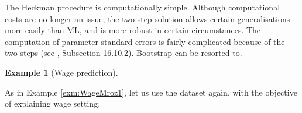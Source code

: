 \documentclass[
  12pt,
]{book}
\newenvironment{Shaded}{\begin{snugshade}}{\end{snugshade}}
\newcommand{\AttributeTok}[1]{\textcolor[rgb]{0.13,0.29,0.53}{#1}}
\newcommand{\CommentTok}[1]{\textcolor[rgb]{0.56,0.35,0.01}{\textit{#1}}}
\newcommand{\ConstantTok}[1]{\textcolor[rgb]{0.56,0.35,0.01}{#1}}
\newcommand{\DecValTok}[1]{\textcolor[rgb]{0.00,0.00,0.81}{#1}}
\newcommand{\FunctionTok}[1]{\textcolor[rgb]{0.13,0.29,0.53}{\textbf{#1}}}
\newcommand{\NormalTok}[1]{#1}
\newcommand{\OtherTok}[1]{\textcolor[rgb]{0.56,0.35,0.01}{#1}}
\newcommand{\SpecialCharTok}[1]{\textcolor[rgb]{0.81,0.36,0.00}{\textbf{#1}}}
\newcommand{\StringTok}[1]{\textcolor[rgb]{0.31,0.60,0.02}{#1}}
\theoremstyle{definition}
\theoremstyle{definition}
\newtheorem{example}{Example}[chapter]
\theoremstyle{definition}
\theoremstyle{definition}
\theoremstyle{remark}
\begin{document}
The Heckman procedure is computationally simple. Although computational costs are no longer an issue, the two-step solution allows certain generalisations more easily than ML, and is more robust in certain circumstances. The computation of parameter standard errors is fairly complicated because of the two steps (see \citet{Cameron_Trivedi_2005}, Subsection 16.10.2). Bootstrap can be resorted to.

\begin{example}[Wage prediction]
\protect\hypertarget{exm:WageSample}{}\label{exm:WageSample}

As in Example \ref{exm:WageMroz1}, let us use the \citet{Mroz_1987} dataset again, with the objective of explaining wage setting.

\begin{Shaded}
\end{Shaded}
\end{example}
\end{document}
